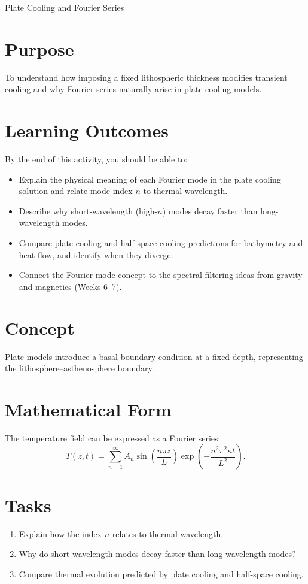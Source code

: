 \begin{activity}{Plate Cooling and Fourier Series}

\section*{Purpose}
To understand how imposing a fixed lithospheric thickness modifies transient
cooling and why Fourier series naturally arise in plate cooling models.

{\color{red}
\section*{Learning Outcomes}

By the end of this activity, you should be able to:
\begin{itemize}
  \item Explain the physical meaning of each Fourier mode in the plate cooling solution and relate mode index $n$ to thermal wavelength.
  \item Describe why short-wavelength (high-$n$) modes decay faster than long-wavelength modes.
  \item Compare plate cooling and half-space cooling predictions for bathymetry and heat flow, and identify when they diverge.
  \item Connect the Fourier mode concept to the spectral filtering ideas from gravity and magnetics (Weeks 6--7).
\end{itemize}
}

\section*{Concept}
Plate models introduce a basal boundary condition at a fixed depth, representing
the lithosphere--asthenosphere boundary.

\section*{Mathematical Form}
The temperature field can be expressed as a Fourier series:
\[
T(z,t) = \sum_{n=1}^{\infty} A_n
\sin\!\left(\frac{n\pi z}{L}\right)
\exp\!\left(-\frac{n^2 \pi^2 \kappa t}{L^2}\right).
\]

\section*{Tasks}
\begin{enumerate}
  \item Explain how the index $n$ relates to thermal wavelength.
  \answerbox[2cm]
  \item Why do short-wavelength modes decay faster than long-wavelength modes?
  \answerbox[3cm]
  \item Compare thermal evolution predicted by plate cooling and half-space cooling.
  \answerbox[3cm]
\end{enumerate}


\end{activity}
